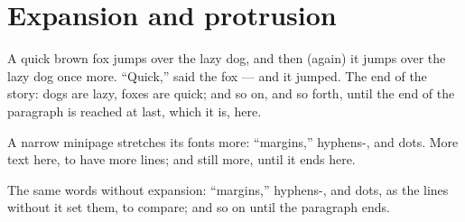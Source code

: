 \documentclass{article}
\begin{document}
\section{Expansion and protrusion}

A quick brown fox jumps over the lazy dog, and then (again) it jumps over
the lazy dog once more. ``Quick,'' said the fox --- and it jumped. The end
of the story: dogs are lazy, foxes are quick; and so on, and so forth,
until the end of the paragraph is reached at last, which it is, here.

\begin{minipage}{0.4\textwidth}
A narrow minipage stretches its fonts more: ``margins,'' hyphens-, and dots.
More text here, to have more lines; and still more, until it ends here.
\end{minipage}

The same words without expansion: ``margins,'' hyphens-, and dots, as the
lines without it set them, to compare; and so on until the paragraph ends.
\end{document}
